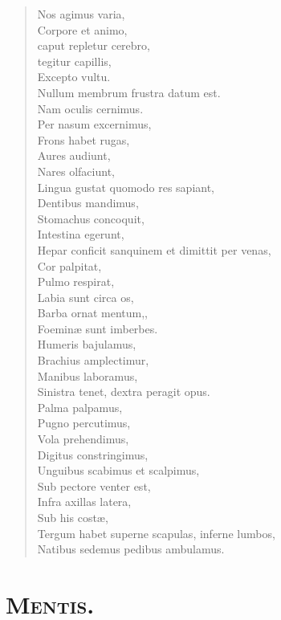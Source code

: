 \documentclass[12pt,  postvopaper]{memoir}
\begin{document}
\begin{verse}

  Nos agimus varia,\\
  Corpore et animo,\\
  caput repletur cerebro,\\
  tegitur capillis,\\
  Excepto vultu.\\
  Nullum membrum frustra datum est.\\
  Nam oculis cernimus.\\
  Per nasum excernimus,\\
  Frons habet rugas,\\
  Aures audiunt,\\
  Nares olfaciunt,\\
  Lingua gustat quomodo res sapiant,\\
  Dentibus mandimus,\\
  Stomachus concoquit,\\
  Intestina egerunt,\\
  Hepar conficit sanquinem et dimittit per venas,\\
  Cor palpitat,\\
  Pulmo respirat,\\
  Labia sunt circa os,\\
  Barba ornat mentum,,\\
  Foeminæ sunt imberbes.\\
  Humeris bajulamus,\\
  Brachius amplectimur,\\
  Manibus laboramus,\\
  Sinistra tenet, dextra peragit opus.\\
  Palma palpamus,\\
  Pugno percutimus,\\
  Vola prehendimus,\\
  Digitus constringimus,\\
  Unguibus scabimus et scalpimus,\\
  Sub pectore venter est,\\
  Infra axillas latera,\\
  Sub his costæ,\\
  Tergum habet superne scapulas, inferne lumbos,\\
  Natibus sedemus pedibus ambulamus.\\
\end{verse}


\section*{\textsc{Mentis.}}
\end{document}
